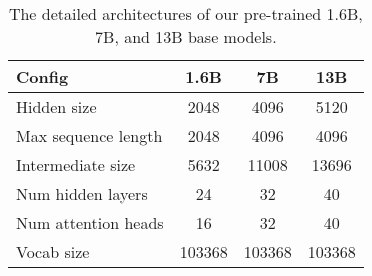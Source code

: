 \begin{table}[tb]
\caption{The detailed architectures of our pre-trained 1.6B, 7B, and 13B base models.}
\label{model_architecture}
\begin{center}
\begin{small}
\begin{tabular}{lccc}
\toprule
Config & 1.6B & 7B & 13B \\
\midrule
Hidden size & 2048 & 4096 & 5120 \\
Max sequence length & 2048 & 4096 & 4096 \\
Intermediate size & 5632 & 11008 & 13696 \\
Num hidden layers & 24 & 32 & 40 \\
Num attention heads & 16 & 32 & 40 \\
Vocab size & 103368 & 103368 & 103368 \\
\bottomrule
\end{tabular}
\end{small}
\end{center}
\end{table}
